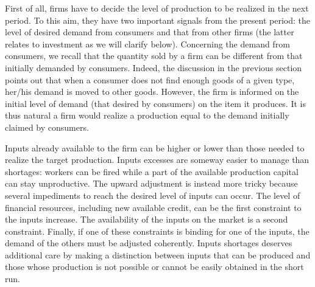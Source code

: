\documentclass{book}
\begin{document}
First of all, firms have to decide the level of production to be realized in the next period. To this aim, they have two important signals from the present period: the level of desired demand from consumers and that from other firms (the latter relates to investment as we will clarify below).
Concerning the demand from consumers, we recall that the quantity sold by a firm can be different from that initially demanded by consumers. Indeed, the discussion in the previous section points out that when a consumer does not find enough goods of a given type, her/his demand is moved
to other goods.
However, the firm is informed on the initial level of demand (that desired by consumers) on the item it produces. It is thus natural a firm would realize a production equal to the demand initially claimed by consumers.  


Inputs already available to the firm can be higher or lower than those needed to realize the target production. Inputs excesses are someway easier to manage than shortages: workers can be fired while a part of the available production capital can stay unproductive.
The upward adjustment is instead more tricky because 
several impediments to reach the desired level of inputs can occur.
The level of financial resources, including new available credit, can be the first constraint to the inputs increase. The availability of the inputs on the market is a second constraint. Finally, if one of these constraints is binding for one of the inputs, the demand of the others must be adjusted coherently. Inputs shortages deserves additional care by making a distinction between inputs that can be produced and those whose production is not possible or cannot be easily obtained in the short run. 
\end{document}

